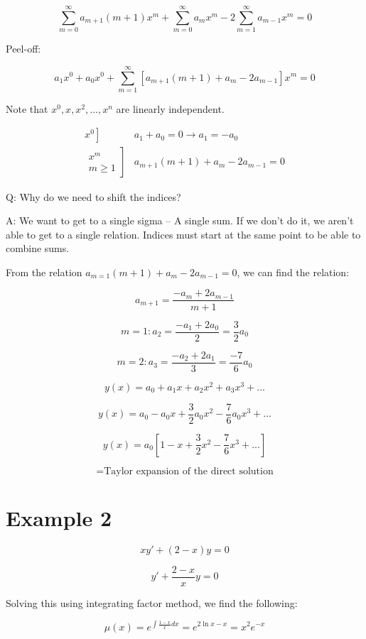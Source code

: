 \documentclass{article}
\begin{document}
$$ \sum_{m = 0}^{\infty} a_{m+1} (m+1)x^m + \sum_{m = 0}^{\infty} a_m x^m - 2 \sum_{m = 1}^{\infty} a_{m-1} x^m = 0$$

Peel-off:

$$a_1 x^0 + a_0 x^0 + \sum_{m = 1}^{\infty} \left[a_{m+1} (m+1) + a_m - 2 a_{m-1} \right] x^m = 0$$

Note that $x^0, x, x^2, ..., x^n$ are linearly independent. 


$$\begin{matrix} \left. x^0 \right] & a_1 + a_0 = 0 \to a_1 = - a_0 \\
\left. \begin{matrix} x^m\\ m \geq 1 \end{matrix} \right] & a_{m+1} (m+1) + a_m - 2 a_{m-1} = 0 \end{matrix}$$

Q: Why do we need to shift the indices?

A: We want to get to a single sigma -- A single sum. If we don't do it, we aren't able to get to a single relation. Indices must start at the same point to be able to combine sums. 

From the relation $a_{m=1} (m+1) + a_m - 2 a_{m-1} = 0$, we can find the relation:

$$a_{m+1} = \frac{-a_m + 2 a_{m-1}}{m+1}$$

$$m = 1: a_2 = \frac{-a_1 + 2 a_0}{2} = \frac{3}{2} a_0$$

$$m = 2: a_3 = \frac{-a_2 + 2 a_1}{3} = \frac{-7}{6} a_0$$

$$y(x) = a_0 + a_1 x + a_2 x^2 + a_3 x^3 + ...$$

$$ y(x) = a_0 - a_0 x + \frac{3}{2} a_0 x^2 - \frac{7}{6} a_0 x^3 + ...$$

$$y(x) = a_0 \left[ 1 - x + \frac{3}{2} x^2 - \frac{7}{6} x^3 + ... 
\right]$$

$$ = \text{Taylor expansion of the direct solution}$$

\section{Example 2}

$$ x y' + (2 - x) y = 0$$

$$ y' + \frac{2-x}{x} y = 0$$

Solving this using integrating factor method, we find the following:

$$\mu(x) = e^{\int \frac{1-x}{x} dx} = e^{2 \ln x - x} = x^2 e^{-x}$$
\end{document}
